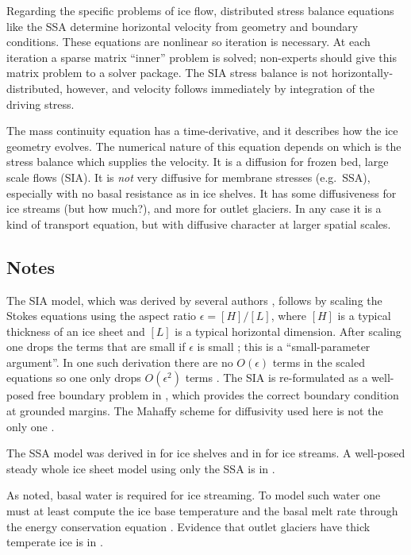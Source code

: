 \documentclass[letterpaper,final,12pt,reqno]{amsart}
\newcommand{\eps}{\epsilon}
\begin{document}
Regarding the specific problems of ice flow, distributed stress balance equations like the SSA determine horizontal velocity from geometry and boundary conditions.  These equations are nonlinear so iteration is necessary.  At each iteration a sparse matrix ``inner'' problem is solved; non-experts should give this matrix problem to a solver package.  The SIA stress balance is not horizontally-distributed, however, and velocity follows immediately by integration of the driving stress.

The mass continuity equation has a time-derivative, and it describes how the ice geometry evolves.  The numerical nature of this equation depends on which is the stress balance which supplies the velocity.  It is a diffusion for frozen bed, large scale flows (SIA).  It is \emph{not} very diffusive for membrane stresses (e.g.~SSA), especially with no basal resistance as in ice shelves.  It has some diffusiveness for ice streams (but how much?), and more for outlet glaciers.  In any case it is a kind of transport equation, but with diffusive character at larger spatial scales.


\small
\subsection{Notes} \label{sec:nr}

The SIA model, which was derived by several authors \cite{FowlerLarson1978,Hutter,MorlandJohnson}, follows by scaling the Stokes equations using the aspect ratio $\eps = [H]/[L]$, where $[H]$ is a typical thickness of an ice sheet and $[L]$ is a typical horizontal dimension.  After scaling one drops the terms that are small if $\eps$ is small \cite{Fowler,Hutter}; this is a ``small-parameter argument''.  In one such derivation there are no $O(\eps)$ terms in the scaled equations so one only drops $O(\eps^2)$ terms \cite{Fowler}.  The SIA is re-formulated as a well-posed free boundary problem in \cite{JouvetBueler2012}, which provides the correct boundary condition at grounded margins.  The Mahaffy scheme for diffusivity used here \cite{Mahaffy} is not the only one \cite{HindmarshPayne}.

The SSA model \cite{WeisGreveHutter} was derived in \cite{Morland} for ice shelves and in \cite{MacAyeal} for ice streams.  A well-posed steady whole ice sheet model using only the SSA is in \cite{SchoofStream}.

As noted, basal water is required for ice streaming.  To model such water one must at least compute the ice base temperature and the basal melt rate through the energy conservation equation \cite{AschwandenBuelerKhroulevBlatter,BBssasliding,Clarke05,Raymondenergy}.  Evidence that outlet glaciers have thick temperate ice is in \cite{Luethietal2009}.
\end{document}
